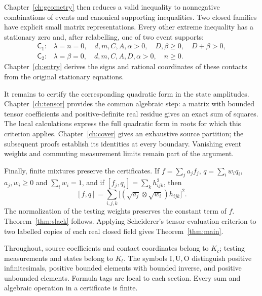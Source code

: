 Chapter~\ref{ch:geometry} then reduces a valid inequality to
nonnegative combinations of events and canonical supporting
inequalities. Two closed families have explicit small matrix
representations. Every other extreme inequality has a stationary
zero and, after relabelling, one of two event supports:
\[
\begin{array}{ll}
\mathsf C_1:&\lambda=n=0,\quad d,m,C,A,\alpha>0,
                       \quad D,\beta\ge0,\quad D+\beta>0,\\
\mathsf C_2:&\lambda=\beta=0,\quad d,m,C,A,D,\alpha>0,
                       \quad n\ge0.
\end{array}
\]
Chapter~\ref{ch:entry} derives the signs and rational coordinates
of these contacts from the original stationary equations.

It remains to certify the corresponding quadratic form in the
state amplitudes. Chapter~\ref{ch:tensor} provides the common
algebraic step: a matrix with bounded tensor coefficients and
positive-definite real residue gives an exact sum of squares.
The local calculations express the full quadratic form in roots
for which this criterion applies. Chapter~\ref{ch:cover} gives
an exhaustive source partition; the subsequent proofs establish
its identities at every boundary. Vanishing event weights and
commuting measurement limits remain part of the argument.

Finally, finite mixtures preserve the certificates. If
$f=\sum_j a_jf_j$, $q=\sum_iw_iq_i$, $a_j,w_i\ge0$ and
$\sum_iw_i=1$, and if $[f_j,q_i]=\sum_k h_{ijk}^2$, then
\[
 [f,q]=\sum_{i,j,k}
       \bigl[(\sqrt{a_j}\otimes\sqrt{w_i})h_{ijk}\bigr]^2.
 \tag{M2}
\]
The normalization of the testing weights preserves the constant
term of $f$. Theorem~\ref{thm:slack} follows. Applying
Scheiderer's tensor-evaluation criterion
\cite[Corollary 3.19]{scheiderer} to two labelled copies of each
real closed field gives Theorem~\ref{thm:main}.

Throughout, source coefficients and contact coordinates belong
to $K_c$; testing measurements and states belong to $K_t$.
The symbols $\mathrm I,\mathrm U,\mathrm O$ distinguish positive
infinitesimals, positive bounded elements with bounded inverse,
and positive unbounded elements. Formula tags are local to each
section. Every sum and algebraic operation in a certificate is finite.
